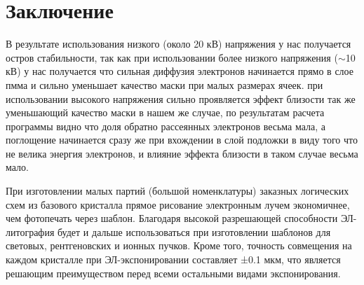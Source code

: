 \chapter*{Заключение}
В результате использования низкого (около 20 кВ) напряжения у нас получается остров стабильности,
так как при использовании более низкого напряжения (\(\sim\)10 кВ) у нас получается что сильная диффузия электронов начинается прямо в слое пмма и сильно уменьшает качество маски при малых размерах ячеек.
при использовании высокого напряжения сильно проявляется эффект близости так же уменьшающий качество маски
в нашем же случае, по результатам расчета программы видно что доля обратно рассеянных электронов весьма мала, а поглощение начинается сразу же при вхождении в слой подложки в виду того что не велика энергия электронов, и влияние эффекта близости в таком случае весьма мало.


При изготовлении малых партий (большой номенклатуры) заказных логических схем из базового кристалла прямое рисование электронным лучем экономичнее, чем фотопечать через шаблон. Благодаря высокой разрешающей способности ЭЛ-литография будет и дальше использоваться при изготовлении шаблонов для световых, рентгеновских и ионных пучков. Кроме того, точность совмещения на каждом кристалле при ЭЛ-экспонировании составляет ±0.1 мкм, что является решающим преимуществом перед всеми остальными видами экспонирования.
